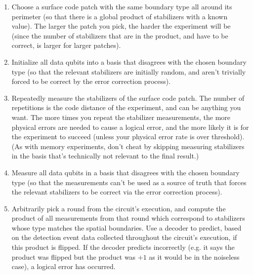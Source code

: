 \documentclass[onecolumn,unpublished,a4paper]{quantumarticle}
\theoremstyle{definition}
\theoremstyle{definition}
\theoremstyle{definition}
\begin{document}
\begin{enumerate}

\item Choose a surface code patch with the same boundary type all around its perimeter (so that there is a global product of stabilizers with a known value).
The larger the patch you pick, the harder the experiment will be (since the number of stabilizers that are in the product, and have to  be correct, is larger for larger patches).

\item Initialize all data qubits into a basis that disagrees with the chosen boundary type (so that the relevant stabilizers are initially random, and aren't trivially forced to be correct by the error correction process).

\item Repeatedly measure the stabilizers of the surface code patch.
The number of repetitions is the code distance of the experiment, and can be anything you want.
The more times you repeat the stabilizer measurements, the more physical errors are needed to cause a logical error, and the more likely it is for the experiment to succeed (unless your physical error rate is over threshold).
(As with memory experiments, don't cheat by skipping measuring stabilizers in the basis that's technically not relevant to the final result.)

\item Measure all data qubits in a basis that disagrees with the chosen boundary type (so that the measurements can't be used as a source of truth that forces the relevant stabilizers to be correct via the error correction process).

\item Arbitrarily pick a round from the circuit's execution, and compute the product of all measurements from that round which correspond to stabilizers whose type matches the spatial boundaries.
Use a decoder to predict, based on the detection event data collected throughout the circuit's execution, if this product is flipped.
If the decoder predicts incorrectly (e.g. it says the product was flipped but the product was $+1$ as it would be in the noiseless case), a logical error has occurred.

\end{enumerate}
\end{document}
